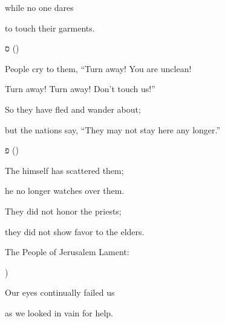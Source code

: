 {\par }{\Q while no one dares
\par }{\Q to touch their garments.
\par }{\SH ס ({})
\par }{\Q {}People cry to them, “Turn away! You are unclean!
\par }{\Q Turn away! Turn away! Don’t touch us!”
\par }{\Q So they have fled and wander about;
\par }{\Q but the nations say, “They may not stay here any longer.”
\par }{\SH פ ({})
\par }{\Q {}The
{} himself has scattered them;
\par }{\Q he no longer watches over them.
\par }{\Q They did not honor the priests;
\par }{\Q they did not show favor to the elders.
\par }{\SH The People of Jerusalem Lament:
\par }{\SH 
{})
\par }{\Q {}Our
eyes
continually
failed us
\par }{\Q as we
looked in
vain for
help.

}
